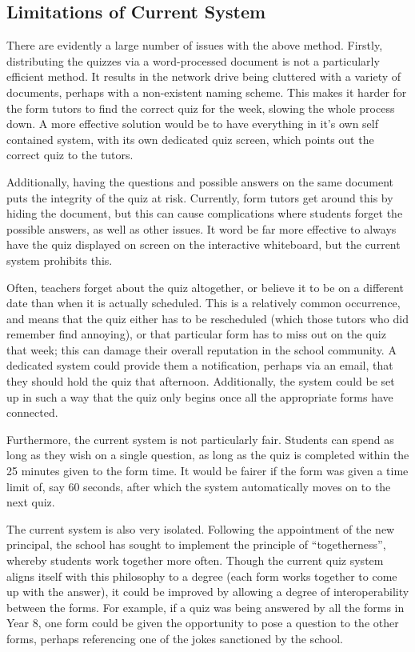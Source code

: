 \subsection{Limitations of Current System} %
\label{ssub:limitations_of_current_system}
There are evidently a large number of issues with the above method. Firstly, distributing the quizzes via a word-processed document is not a particularly efficient method. It results in the network drive being cluttered with a variety of documents, perhaps with a non-existent naming scheme. This makes it harder for the form tutors to find the correct quiz for the week, slowing the whole process down. A more effective solution would be to have everything in it's own self contained system, with its own dedicated quiz screen, which points out the correct quiz to the tutors.

Additionally, having the questions and possible answers on the same document puts the integrity of the quiz at risk. Currently, form tutors get around this by hiding the document, but this can cause complications where students forget the possible answers, as well as other issues. It word be far more effective to always have the quiz displayed on screen on the interactive whiteboard, but the current system prohibits this.

Often, teachers forget about the quiz altogether, or believe it to be on a different date than when it is actually scheduled. This is a relatively common occurrence, and means that the quiz either has to be rescheduled (which those tutors who did remember find annoying), or that particular form has to miss out on the quiz that week; this can damage their overall reputation in the school community. A dedicated system could provide them a notification, perhaps via an email, that they should hold the quiz that afternoon. Additionally, the system could be set up in such a way that the quiz only begins once all the appropriate forms have connected.

Furthermore, the current system is not particularly fair. Students can spend as long as they wish on a single question, as long as the quiz is completed within the 25 minutes given to the form time. It would be fairer if the form was given a time limit of, say 60 seconds, after which the system automatically moves on to the next quiz.

The current system is also very isolated. Following the appointment of the new principal, the school has sought to implement the principle of ``togetherness'', whereby students work together more often. Though the current quiz system aligns itself with this philosophy to a degree (each form works together to come up with the answer), it could be improved by allowing a degree of interoperability between the forms. For example, if a quiz was being answered by all the forms in Year 8, one form could be given the opportunity to pose a question to the other forms, perhaps referencing one of the jokes sanctioned by the school.

